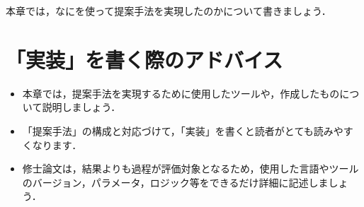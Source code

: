 本章では，なにを使って提案手法を実現したのかについて書きましょう．

\section{「実装」を書く際のアドバイス}
\begin{itemize}
    \item 本章では，提案手法を実現するために使用したツールや，作成したものについて説明しましょう．
    \item 「提案手法」の構成と対応づけて，「実装」を書くと読者がとても読みやすくなります．
    \item 修士論文は，結果よりも過程が評価対象となるため，使用した言語やツールのバージョン，パラメータ，ロジック等をできるだけ詳細に記述しましょう．
\end{itemize}